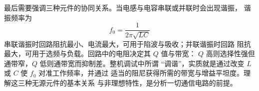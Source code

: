 最后需要强调三种元件的协同关系。当电感与电容串联或并联时会出现谐振，
谐振频率为
\begin{equation}
f_0 = \frac{1}{2\pi\sqrt{LC}}
\end{equation}
串联谐振时回路阻抗最小、电流最大，可用于陷波与吸收；并联谐振时回路
阻抗最大，可用于选频与负载。回路中的电阻决定其 $Q$ 值与带宽：
$Q$ 高则选择性强但通带窄，$Q$ 低则通带宽而抑制差。整机调试中所谓
“调谐”，实质就是通过改变 $L$ 或 $C$ 使 $f_0$ 对准工作频率，并通过
适当的阻尼获得所需的带宽与增益平坦度。理解这三种无源元件的基本关系
与非理想特性，是分析一切通信电路的前提。
